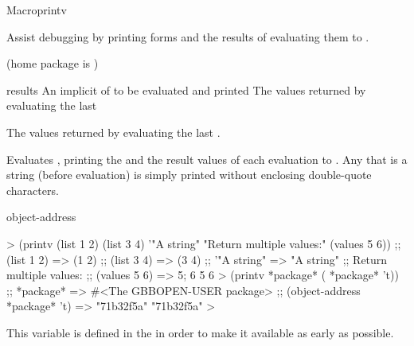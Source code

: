 \documentclass[10pt,twoside,english,pdftex]{article}
\begin{document}

\begin{functiondoc}{Macro}{printv}{%
    }
% 

\fnsyntax

\fnpurpose Assist debugging by printing forms and the results of
evaluating them to .

\fnpackage {} (home package is
)

\fnmodule {}

\fnargs
\begin{args}{results}
\arg[forms] An implicit  of  to be
evaluated and printed  
\arg[results] The values returned by evaluating the last 
\end{args}

\fnreturns The values returned by evaluating the last .

\fndescription Evaluates , printing the  and the
result values of each evaluation to .  Any
 that is a string (before evaluation) is simply printed without
enclosing double-quote characters.

\begin{alsos}{object-address}
\end{alsos}

%
\fnexamples
%
\W\supp
\begin{example}
  > (printv (list 1 2) (list 3 4) '"A string" 
            "Return multiple values:" (values 5 6))
  ;;  (list 1 2) => (1 2)
  ;;  (list 3 4) => (3 4)
  ;;  '"A string" => "A string"
  ;; Return multiple values:
  ;;  (values 5 6) => 5; 6
  5
  6\goodpagebreak
  > (printv *package* ( *package* 't))
  ;;  *package* => #<The GBBOPEN-USER package>
  ;;  (object-address *package* 't) => "71b32f5a"
  "71b32f5a"
  >
\end{example}

\fnnote
{}%
%
%
This variable is defined in the  
in order to make it available as early as possible.

\end{functiondoc}
\end{document}
